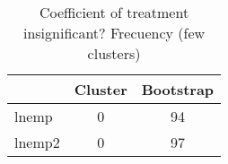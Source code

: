 \begin{table}[htbp]\centering
\caption{Coefficient of treatment insignificant? Frecuency (few clusters)}
\begin{tabular}{l*{2}{c}}
\toprule
            &     Cluster&   Bootstrap\\
\midrule
lnemp       &           0&          94\\
lnemp2      &           0&          97\\
\bottomrule
\end{tabular}
\end{table}
